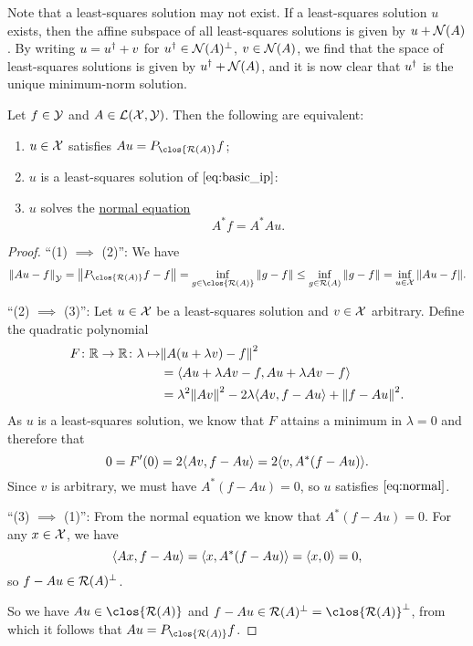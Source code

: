 Note that a least-squares solution may not exist. If a least-squares solution $u$ exists, then the affine subspace of all least-squares solutions is given by $u + \operatorname{\mathcal N}(A)$. By writing $u = u^\dagger + v$ for $u^\dagger \in \operatorname{\mathcal N}(A)^\perp$, $v \in \operatorname{\mathcal N}(A)$, we find that the space of least-squares solutions is given by $u^\dagger + \operatorname{\mathcal N}(A)$, and it is now clear that $u^\dagger$ is the unique minimum-norm solution. 

\begin{theorem}
    Let $f \in \mathcal Y$ and $A \in \mathcal L(\mathcal X, \mathcal Y)$. Then the following are equivalent:
    \begin{enumerate}
        \item $u \in \mathcal X$ satisfies $Au = P_{\clos{\Ran(A)} }f$;
        \item $u$ is a least-squares solution of $\cref{eq:basic_ip}$:
        \item $u$ solves the \uline{normal equation}
        \begin{equation} \label{eq:normal}
                   A^* f = A^* A u. 
        \end{equation}
    \end{enumerate}
\end{theorem}

\begin{proof}
     ``(1) $\implies$ (2)'': We have
     \[
     \norm{Au - f}_\YY = \norm{ P_{\clos{\Ran(A)} }f - f} = \inf_{g \in \clos{\Ran(A)}} \norm{g - f} \leq \inf_{g \in \Ran(A)} \norm{g - f} = \inf_{u \in \XX} \norm{Au - f}. 
     \]
     
     ``(2) $\implies$ (3)'':  Let $u \in \mathcal X$ be a least-squares solution and $v \in \mathcal X$ arbitrary. Define the quadratic polynomial 
     \begin{align*}
     F \colon \mathbb R \to \mathbb R \colon \lambda \mapsto & \norm{A(u + \lambda v) - f}^2 \\
     &= \langle Au + \lambda Av - f, Au + \lambda Av - f\rangle \\
     &= \lambda^2 \norm{Av}^2 - 2\lambda \langle Av, f - Au\rangle + \norm{f - Au}^2. 
     \end{align*}
    As $u$ is a least-squares solution, we know that $F$ attains a minimum in $\lambda =0 $ and therefore that 
    \[
    0 = F'(0) = 2\langle Av, f - Au\rangle = 2 \langle v, A^*(f - Au)\rangle.
    \]
    Since $v$ is arbitrary, we must have $A^*(f - Au) = 0$, so $u$ satisfies $\cref{eq:normal}$. 
    
    ``(3) $\implies$ (1)'':  From the normal equation we know that $A^*(f - Au) = 0$. For any $x \in \mathcal X$, we have
    \[
    \langle Ax, f - Au\rangle = \langle x, A^*(f - Au)\rangle = \langle x, 0\rangle = 0,
    \]
    so $f - Au \in \operatorname{\mathcal R}(A)^\perp$. 
    
    So we have $Au \in \clos{\Ran(A)}$ and $f - Au \in \Ran(A)\P = \clos{\Ran(A)}\P$, from which it follows that $Au = P_{\clos{\Ran(A)}}f$. 
\end{proof}

